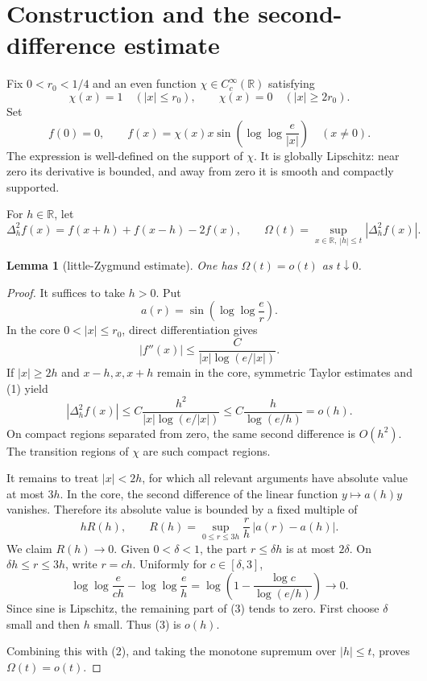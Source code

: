 \documentclass[11pt]{article}
\newtheorem{lemma}{Lemma}
\newcommand{\R}{\mathbb R}
\begin{document}
\section{Construction and the second-difference estimate}

Fix $0<r_0<1/4$ and an even function
$\chi\in C_c^\infty(\R)$ satisfying
\[
 \chi(x)=1\quad (|x|\leq r_0),\qquad
 \chi(x)=0\quad (|x|\geq2r_0).
\]
Set
\[
 f(0)=0,\qquad
 f(x)=\chi(x)x\sin\!\left(\log\log\frac e{|x|}\right)
 \quad(x\ne0).
\]
The expression is well-defined on the support of $\chi$.  It is globally
Lipschitz: near zero its derivative is bounded, and away from zero it is
smooth and compactly supported.

For $h\in\R$, let
\[
 \Delta_h^2f(x)=f(x+h)+f(x-h)-2f(x),\qquad
 \Omega(t)=\sup_{x\in\R,\ |h|\leq t}|\Delta_h^2f(x)|.
\]

\begin{lemma}[little-Zygmund estimate]\label{lem:zyg}
One has $\Omega(t)=o(t)$ as $t\downarrow0$.
\end{lemma}

\begin{proof}
It suffices to take $h>0$.  Put
\[
 a(r)=\sin\!\left(\log\log\frac e r\right).
\]
In the core $0<|x|\leq r_0$, direct differentiation gives
\[
 |f''(x)|\leq
 \frac{C}{|x|\log(e/|x|)}.                                      \tag{1}
\]
If $|x|\geq2h$ and $x-h,x,x+h$ remain in the core, symmetric Taylor
estimates and (1) yield
\[
 |\Delta_h^2f(x)|
 \leq C\frac{h^2}{|x|\log(e/|x|)}
 \leq C\frac{h}{\log(e/h)}=o(h).                              \tag{2}
\]
On compact regions separated from zero, the same second difference is
$O(h^2)$.  The transition regions of $\chi$ are such compact regions.

It remains to treat $|x|<2h$, for which all relevant arguments have
absolute value at most $3h$.  In the core, the second difference of the
linear function $y\mapsto a(h)y$ vanishes.  Therefore its absolute value is
bounded by a fixed multiple of
\[
 hR(h),\qquad
 R(h)=\sup_{0\leq r\leq3h}\frac rh\,|a(r)-a(h)|.             \tag{3}
\]
We claim $R(h)\to0$.  Given $0<\delta<1$, the part $r\leq\delta h$
is at most $2\delta$.  On $\delta h\leq r\leq3h$, write $r=ch$.
Uniformly for $c\in[\delta,3]$,
\[
 \log\log\frac e{ch}-\log\log\frac e h
 =\log\!\left(1-\frac{\log c}{\log(e/h)}\right)
 \longrightarrow0.
\]
Since sine is Lipschitz, the remaining part of (3) tends to zero.  First
choose $\delta$ small and then $h$ small.  Thus (3) is $o(h)$.

Combining this with (2), and taking the monotone supremum over $|h|\leq t$,
proves $\Omega(t)=o(t)$.
\end{proof}
\end{document}
